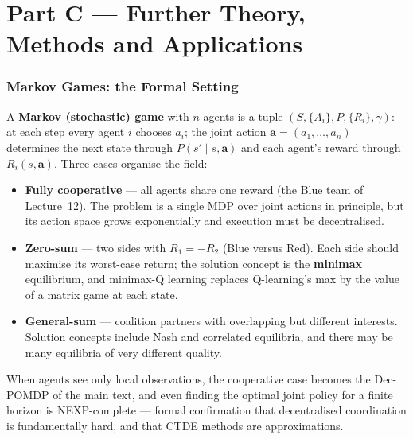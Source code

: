 \documentclass[11pt]{article}
\begin{document}
\clearpage
\part*{Part C --- Further Theory, Methods and Applications}

\section{Markov Games: the Formal Setting}
A \textbf{Markov (stochastic) game} with $n$ agents is a tuple $(S,\{A_i\},P,\{R_i\},\gamma)$: at each step every agent $i$ chooses $a_i$; the joint action $\mathbf a=(a_1,\ldots,a_n)$ determines the next state through $P(s'\mid s,\mathbf a)$ and each agent's reward through $R_i(s,\mathbf a)$. Three cases organise the field:
\begin{itemize}
\item \textbf{Fully cooperative} --- all agents share one reward (the Blue team of Lecture~12). The problem is a single MDP over joint actions in principle, but its action space grows exponentially and execution must be decentralised.
\item \textbf{Zero-sum} --- two sides with $R_1=-R_2$ (Blue versus Red). Each side should maximise its worst-case return; the solution concept is the \textbf{minimax} equilibrium, and minimax-Q learning replaces Q-learning's max by the value of a matrix game at each state.
\item \textbf{General-sum} --- coalition partners with overlapping but different interests. Solution concepts include Nash and correlated equilibria, and there may be many equilibria of very different quality.
\end{itemize}
When agents see only local observations, the cooperative case becomes the Dec-POMDP of the main text, and even finding the optimal joint policy for a finite horizon is NEXP-complete --- formal confirmation that decentralised coordination is fundamentally hard, and that CTDE methods are approximations.
\end{document}
